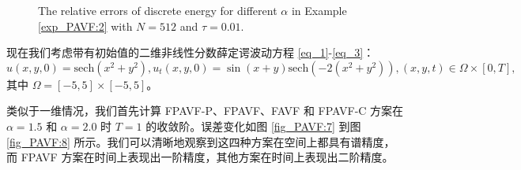	\begin{figure}[H]
	\begin{center}
	  \caption{The relative errors of discrete energy for different $\alpha$ in Example \ref{exp_PAVF:2} with $N = 512$ and $\tau=0.01$.} \label{fig_PAVF:6}
	\end{center}
	\end{figure}
	\begin{example}\label{exp_PAVF:4}
		现在我们考虑带有初始值的二维非线性分数薛定谔波动方程 \eqref{eq_1}-\eqref{eq_3}：
		\begin{equation}\label{eq_PAVF_110}
		u(x,y, 0)=\mbox{sech}\left(x^2+y^2\right), u_t(x,y, 0)=\sin (x+y) \mbox{sech}\left(-2(x^2+y^2)\right), (x,y,t)\in  \Omega\times[0, T],
		\end{equation}
		其中 $\Omega=[-5,5] \times[-5,5]$。
		\end{example}
	类似于一维情况，我们首先计算 FPAVF-P、FPAVF、FAVF 和 FPAVF-C 方案在 $\alpha=1.5$ 和 $\alpha=2.0$ 时 $T=1$ 的收敛阶。误差变化如图 \ref{fig_PAVF:7} 到图 \ref{fig_PAVF:8} 所示。我们可以清晰地观察到这四种方案在空间上都具有谱精度，而 FPAVF 方案在时间上表现出一阶精度，其他方案在时间上表现出二阶精度。

